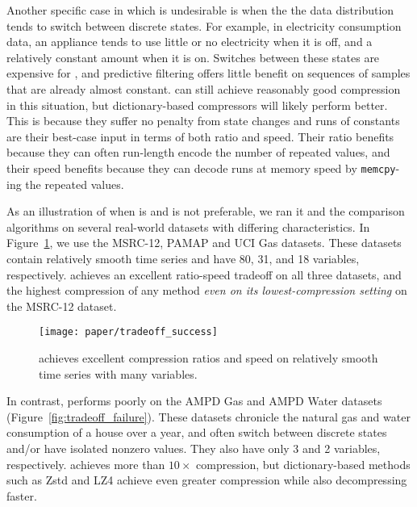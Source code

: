Another specific case in which \minesp is undesirable is when the the data distribution tends to switch between discrete states. For example, in electricity consumption data, an appliance tends to use little or no electricity when it is off, and a relatively constant amount when it is on. Switches between these states are expensive for \mine, and predictive filtering offers little benefit on sequences of samples that are already almost constant. \minesp can still achieve reasonably good compression in this situation, but dictionary-based compressors will likely perform better. This is because they suffer no penalty from state changes and runs of constants are their best-case input in terms of both ratio and speed. Their ratio benefits because they can often run-length encode the number of repeated values, and their speed benefits because they can decode runs at memory speed by \texttt{memcpy}-ing the repeated values.

As an illustration of when \minesp is and is not preferable, we ran it and the comparison algorithms on several real-world datasets with differing characteristics. In Figure~\ref{fig:tradeoff_success}, we use the MSRC-12, PAMAP and UCI Gas datasets. These datasets contain relatively smooth time series and have 80, 31, and 18 variables, respectively. \minesp achieves an excellent ratio-speed tradeoff on all three datasets, and the highest compression of any method \textit{even on its lowest-compression setting} on the MSRC-12 dataset.

\begin{figure}[h]
\begin{center}
    \texttt{[image: paper/tradeoff\_success]}
    \caption{\minesp achieves excellent compression ratios and speed on relatively smooth time series with many variables.}
    \label{fig:tradeoff_success}
\end{center}
\end{figure}

In contrast, \minesp performs poorly on the AMPD Gas and AMPD Water datasets (Figure~\ref{fig:tradeoff_failure}). These datasets chronicle the natural gas and water consumption of a house over a year, and often switch between discrete states and/or have isolated nonzero values. They also have only 3 and 2 variables, respectively. \minesp achieves more than $10\times$ compression, but dictionary-based methods such as Zstd and LZ4 achieve even greater compression while also decompressing faster.


